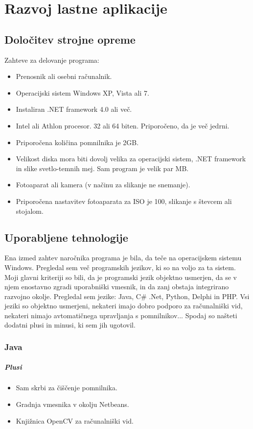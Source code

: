 \documentclass[oneside, a4paper, 12pt]{book}
\begin{document}
\chapter{Razvoj lastne aplikacije}
\section{Določitev strojne opreme}
Zahteve za delovanje programa:
\begin{itemize}
\item Prenosnik ali osebni računalnik.
\item Operacijski sistem Windows XP, Vista ali 7.
\item Instaliran .NET framework 4.0 ali več.
\item Intel ali Athlon procesor. 32 ali 64 biten. Priporočeno, da je več jedrni.
\item Priporočena količina pomnilnika je 2GB.
\item Velikost diska mora biti dovolj velika za operacijski sistem, .NET framework in slike svetlo-temnih mej. Sam program je velik par MB. 
\item Fotoaparat ali kamera (v načinu za slikanje ne snemanje).
\item Priporočena nastavitev fotoaparata za ISO je 100, slikanje s števcem ali stojalom.
\end{itemize}

\section{Uporabljene tehnologije}
Ena izmed zahtev naročnika programa je bila, da teče na operacijskem sistemu Windows. Pregledal sem več programskih jezikov, ki so na voljo za ta sistem. Moji glavni kriteriji so bili, da je programski jezik objektno usmerjen, da se v njem enostavno zgradi uporabniški vmesnik, in da zanj obstaja integrirano razvojno okolje. Pregledal sem jezike: Java, C\# .Net, Python, Delphi in PHP. Vsi jeziki so objektno usmerjeni, nekateri imajo dobro podporo za računalniški vid, nekateri nimajo avtomatičnega upravljanja s pomnilnikov... Spodaj so našteti dodatni plusi in minusi, ki sem jih ugotovil.

\subsection{Java}
\paragraph{Plusi}
\begin{itemize}
\item Sam skrbi za čiščenje pomnilnika.
\item Gradnja vmesnika v okolju Netbeans.
\item Knjižnica OpenCV za računalniški vid.
\end{itemize}
\end{document}
